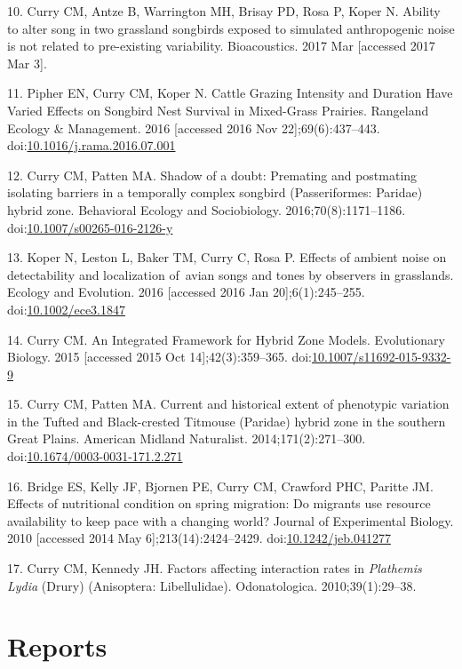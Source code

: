 \documentclass[
  letterpaper,
  DIV=11,
  numbers=noendperiod,
  oneside]{scrreprt}
\begin{document}
10. Curry CM, Antze B, Warrington MH, Brisay PD, Rosa P, Koper N.
Ability to alter song in two grassland songbirds exposed to simulated
anthropogenic noise is not related to pre-existing variability.
Bioacoustics. 2017 Mar {[}accessed 2017 Mar 3{]}.

11. Pipher EN, Curry CM, Koper N. Cattle {Grazing Intensity} and
{Duration Have Varied Effects} on {Songbird Nest Survival} in
{Mixed-Grass Prairies}. Rangeland Ecology \& Management. 2016
{[}accessed 2016 Nov 22{]};69(6):437--443.
doi:\href{https://doi.org/10.1016/j.rama.2016.07.001}{10.1016/j.rama.2016.07.001}

12. Curry CM, Patten MA. Shadow of a doubt: Premating and postmating
isolating barriers in a temporally complex songbird ({Passeriformes}:
{Paridae}) hybrid zone. Behavioral Ecology and Sociobiology.
2016;70(8):1171--1186.
doi:\href{https://doi.org/10.1007/s00265-016-2126-y}{10.1007/s00265-016-2126-y}

13. Koper N, Leston L, Baker TM, Curry C, Rosa P. Effects of ambient
noise on detectability and localization of~avian songs and tones by
observers in grasslands. Ecology and Evolution. 2016 {[}accessed 2016
Jan 20{]};6(1):245--255.
doi:\href{https://doi.org/10.1002/ece3.1847}{10.1002/ece3.1847}

14. Curry CM. An {Integrated Framework} for {Hybrid Zone Models}.
Evolutionary Biology. 2015 {[}accessed 2015 Oct 14{]};42(3):359--365.
doi:\href{https://doi.org/10.1007/s11692-015-9332-9}{10.1007/s11692-015-9332-9}

15. Curry CM, Patten MA. Current and historical extent of phenotypic
variation in the {Tufted} and {Black-crested Titmouse} ({Paridae})
hybrid zone in the southern {Great Plains}. American Midland Naturalist.
2014;171(2):271--300.
doi:\href{https://doi.org/10.1674/0003-0031-171.2.271}{10.1674/0003-0031-171.2.271}

16. Bridge ES, Kelly JF, Bjornen PE, Curry CM, Crawford PHC, Paritte JM.
Effects of nutritional condition on spring migration: Do migrants use
resource availability to keep pace with a changing world? Journal of
Experimental Biology. 2010 {[}accessed 2014 May 6{]};213(14):2424--2429.
doi:\href{https://doi.org/10.1242/jeb.041277}{10.1242/jeb.041277}

17. Curry CM, Kennedy JH. Factors affecting interaction rates in
{\emph{Plathemis}}{ \emph{Lydia}} ({Drury}) ({Anisoptera}:
{Libellulidae}). Odonatologica. 2010;39(1):29--38.

\section{Reports}\label{reports}
\end{document}
